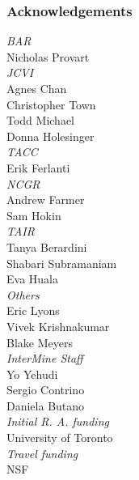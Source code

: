 \documentclass{beamer}
\newcommand{\textemphb}[1]{\emph{\textcolor{beamerblue}{#1}}}
\begin{document}
\begin{frame}
    \frametitle{Acknowledgements}
        \begin{multicols}{3}
            \textemphb{BAR}\\
            Nicholas Provart\\
            \vspace{\baselineskip}
            \textemphb{JCVI}\\
            Agnes Chan\\
            Christopher Town\\
            Todd Michael\\
            Donna Holesinger\\
            \vspace{\baselineskip}
            \textemphb{TACC}\\
            Erik Ferlanti\\
            \vspace{\baselineskip}
            \textemphb{NCGR}\\
            Andrew Farmer\\
            Sam Hokin\\
            \vspace{\baselineskip}
            \textemphb{TAIR}\\
            Tanya Berardini\\
            Shabari Subramaniam\\
            Eva Huala\\
            \vspace{\baselineskip}
            \textemphb{Others}\\
            Eric Lyons\\
            Vivek Krishnakumar\\
            Blake Meyers\\
            \vspace{\baselineskip}
            \textemphb{InterMine Staff} \\
            Yo Yehudi\\
            Sergio Contrino\\
            Daniela Butano\\
            \vspace{\baselineskip}
            \textemphb{Initial R. A. funding}\\
            University of Toronto\\
            \vspace{\baselineskip}
            \textemphb{Travel funding}\\
            NSF\\
        \end{multicols}
\end{frame}
\end{document}
